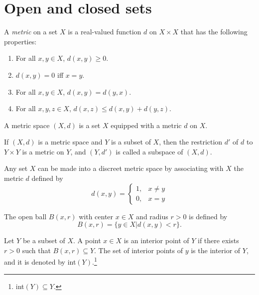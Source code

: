 \documentclass[nobib,notoc]{tufte-handout}
\begin{document}
\section{Open and closed sets}
\begin{defi}[Metric]
	A \emph{metric} on a set \(X\) is a real-valued function \(d\) on \(X\times X\) that has the following properties:
	\begin{enumerate}[label=(\alph*)]
		\item For all \(x,y\in X\), \(d(x,y)\geq 0\).
		\item \(d(x,y)=0\) iff \(x=y\).
		\item For all \(x,y\in X\), \(d(x,y)=d(y,x)\).
		\item For all \(x,y,z\in X\), \(d(x,z)\leq d(x,y)+d(y,z)\).
	\end{enumerate}
\end{defi}
\begin{defi}
	A metric space \((X,d)\) is a set \(X\) equipped with a metric \(d\) on \(X\).
\end{defi}
\begin{defi}[Subspace]
	If \((X,d)\) is a metric space and \(Y\) is a subset of \(X\), then the restriction \(d'\) of \(d\) to \(Y\times Y\) is a metric on \(Y\), and \((Y,d')\) is called a subspace of \((X,d)\).
\end{defi}
\begin{rema}
	Any set \(X\) can be made into a discreet metric space by associating with \(X\) the metric \(d\) defined by
	\begin{equation*}
		d(x,y)=\begin{cases}
			1,&x\neq y\\
			0,&x=y
		\end{cases}
	\end{equation*}
\end{rema}
\begin{defi}
	The open ball \(B(x,r)\) with center \(x\in X\) and radius \(r>0\) is defined by
	\begin{equation*}
		B(x,r)=\{y\in X|d(x,y)<r\}.
	\end{equation*}
\end{defi}
\begin{defi}
	Let \(Y\) be a subset of \(X\). A point \(x\in X\) is an interior point of \(Y\) if there exists \(r>0\) such that \(B(x,r)\subseteq Y\). The set of interior points of \(y\) is the interior of \(Y\), and it is denoted by int\((Y)\).\footnote{int\((Y)\subseteq Y.\)}
\end{defi}
\end{document}

